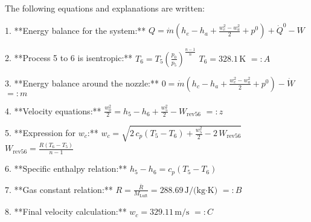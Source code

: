 The following equations and explanations are written:  

1. **Energy balance for the system:**  
   \( Q = \dot{m} (h_{e} - h_{a} + \frac{w_{c}^2 - w_{a}^2}{2} + p^0) + \dot{Q}^0 - W \)  

2. **Process 5 to 6 is isentropic:**  
   \( T_6 = T_5 \left( \frac{p_0}{p_5} \right)^{\frac{n-1}{n}} \)  
   \( T_6 = 328.1 \, \text{K} \)  
   \( =: A \)  

3. **Energy balance around the nozzle:**  
   \( 0 = \dot{m} (h_c - h_a + \frac{w_c^2 - w_a^2}{2} + p^0) - \dot{W} \)  
   \( =: m \)  

4. **Velocity equations:**  
   \( \frac{w_0^2}{2} = h_5 - h_6 + \frac{w_5^2}{2} - W_{\text{rev56}} \)  
   \( =: z \)  

5. **Expression for \( w_c \):**  
   \( w_c = \sqrt{2 \, c_p (T_5 - T_6) + \frac{w_5^2}{2} - 2 \, W_{\text{rev56}}} \)  
   \( W_{\text{rev56}} = \frac{R (T_6 - T_5)}{n - 1} \)  

6. **Specific enthalpy relation:**  
   \( h_5 - h_6 = c_p (T_5 - T_6) \)  

7. **Gas constant relation:**  
   \( R = \frac{\bar{R}}{M_{\text{Luft}}} = 288.69 \, \text{J/(kg·K)} \)  
   \( =: B \)  

8. **Final velocity calculation:**  
   \( w_c = 329.11 \, \text{m/s} \)  
   \( =: C \)